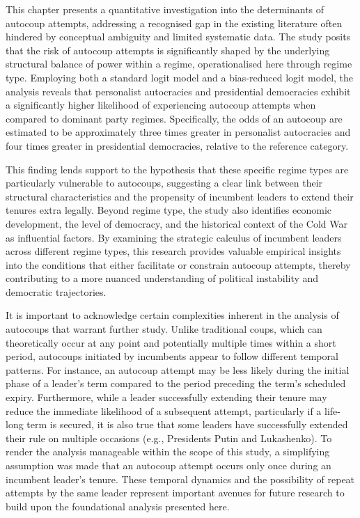 \documentclass[
  12pt,
]{report}
\begin{document}
This chapter presents a quantitative investigation into the determinants
of autocoup attempts, addressing a recognised gap in the existing
literature often hindered by conceptual ambiguity and limited systematic
data. The study posits that the risk of autocoup attempts is
significantly shaped by the underlying structural balance of power
within a regime, operationalised here through regime type. Employing
both a standard logit model and a bias-reduced logit model, the analysis
reveals that personalist autocracies and presidential democracies
exhibit a significantly higher likelihood of experiencing autocoup
attempts when compared to dominant party regimes. Specifically, the odds
of an autocoup are estimated to be approximately three times greater in
personalist autocracies and four times greater in presidential
democracies, relative to the reference category.

This finding lends support to the hypothesis that these specific regime
types are particularly vulnerable to autocoups, suggesting a clear link
between their structural characteristics and the propensity of incumbent
leaders to extend their tenures extra legally. Beyond regime type, the
study also identifies economic development, the level of democracy, and
the historical context of the Cold War as influential factors. By
examining the strategic calculus of incumbent leaders across different
regime types, this research provides valuable empirical insights into
the conditions that either facilitate or constrain autocoup attempts,
thereby contributing to a more nuanced understanding of political
instability and democratic trajectories.

It is important to acknowledge certain complexities inherent in the
analysis of autocoups that warrant further study. Unlike traditional
coups, which can theoretically occur at any point and potentially
multiple times within a short period, autocoups initiated by incumbents
appear to follow different temporal patterns. For instance, an autocoup
attempt may be less likely during the initial phase of a leader's term
compared to the period preceding the term's scheduled expiry.
Furthermore, while a leader successfully extending their tenure may
reduce the immediate likelihood of a subsequent attempt, particularly if
a life-long term is secured, it is also true that some leaders have
successfully extended their rule on multiple occasions (e.g., Presidents
Putin and Lukashenko). To render the analysis manageable within the
scope of this study, a simplifying assumption was made that an autocoup
attempt occurs only once during an incumbent leader's tenure. These
temporal dynamics and the possibility of repeat attempts by the same
leader represent important avenues for future research to build upon the
foundational analysis presented here.
\end{document}
